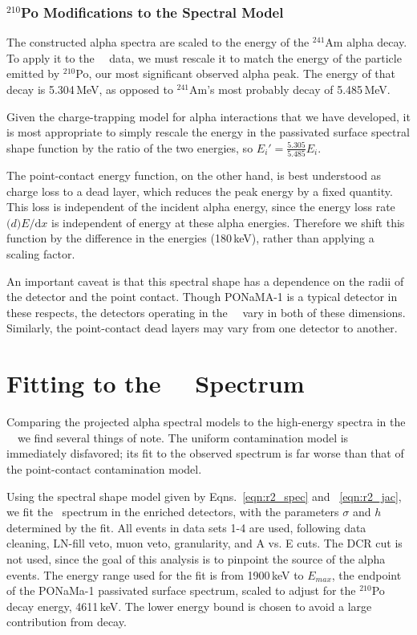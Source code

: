 \subsubsection{$^{210}$Po Modifications to the Spectral Model}
The constructed alpha spectra are scaled to the energy of the $^{241}$Am alpha decay. To apply it to the \MJ\ \DEM\ data, we must rescale it to match the energy of the particle emitted by $^{210}$Po, our most significant observed alpha peak. The energy of that decay is 5.304\,MeV, as opposed to $^{241}$Am's most probably decay of 5.485\,MeV. 

Given the charge-trapping model for alpha interactions that we have developed, it is most appropriate to simply rescale the energy in the passivated surface spectral shape function by the ratio of the two energies, so $E_i' = \frac{5.305}{5.485}E_i$.

The point-contact energy function, on the other hand, is best understood as charge loss to a dead layer, which reduces the peak energy by a fixed quantity. This loss is independent of the incident alpha energy, since the energy loss rate $\mathrm(d)E/\mathrm{d}x$ is independent of energy at these alpha energies. Therefore we shift this function by the difference in the energies (180\,keV), rather than applying a scaling factor. 

An important caveat is that this spectral shape has a dependence on the radii of the detector and the point contact. Though PONaMA-1 is a typical detector in these respects, the detectors operating in the \MJ\ \DEM\ vary in both of these dimensions. Similarly, the point-contact dead layers may vary from one detector to another. 

\section{Fitting to the \MJ\ \DEM\ Spectrum}
Comparing the projected alpha spectral models to the high-energy spectra in the \MJ\ \DEM\, we find several things of note. The uniform contamination model is immediately disfavored; its fit to the observed spectrum is far worse than that of the point-contact contamination model. 

Using the spectral shape model given by Eqns.~\ref{eqn:r2_spec} and ~\ref{eqn:r2_jac}, we fit the \MJ\ spectrum in the enriched detectors, with the parameters $\sigma$ and $h$ determined by the fit. All events in data sets 1-4 are used, following data cleaning, LN-fill veto, muon veto, granularity, and A vs. E cuts. The DCR cut is not used, since the goal of this analysis is to pinpoint the source of the alpha events. The energy range used for the fit is from 1900\,keV to $E_{max}$, the endpoint of the PONaMa-1 passivated surface spectrum, scaled to adjust for the $^{210}$Po decay energy, 4611\,keV. The lower energy bound is chosen to avoid a large contribution from \twonubb decay. 

